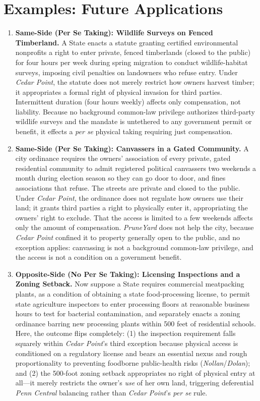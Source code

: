\documentclass[12pt]{article}
\begin{document}
\section{Examples: Future Applications}
\begin{enumerate}

\item \textbf{Same-Side (Per Se Taking): Wildlife Surveys on Fenced Timberland.} A State enacts a statute granting certified environmental nonprofits a right to enter private, fenced timberlands (closed to the public) for four hours per week during spring migration to conduct wildlife-habitat surveys, imposing civil penalties on landowners who refuse entry. Under \textit{Cedar Point}, the statute does not merely restrict how owners harvest timber; it appropriates a formal right of physical invasion for third parties. Intermittent duration (four hours weekly) affects only compensation, not liability. Because no background common-law privilege authorizes third-party wildlife surveys and the mandate is untethered to any government permit or benefit, it effects a \emph{per se} physical taking requiring just compensation.

\item \textbf{Same-Side (Per Se Taking): Canvassers in a Gated Community.} A city ordinance requires the owners' association of every private, gated residential community to admit registered political canvassers two weekends a month during election season so they can go door to door, and fines associations that refuse. The streets are private and closed to the public. Under \textit{Cedar Point}, the ordinance does not regulate how owners use their land; it grants third parties a right to physically enter it, appropriating the owners' right to exclude. That the access is limited to a few weekends affects only the amount of compensation. \textit{PruneYard} does not help the city, because \textit{Cedar Point} confined it to property generally open to the public, and no exception applies: canvassing is not a background common-law privilege, and the access is not a condition on a government benefit.

\item \textbf{Opposite-Side (No Per Se Taking): Licensing Inspections and a Zoning Setback.} Now suppose a State requires commercial meatpacking plants, as a condition of obtaining a state food-processing license, to permit state agriculture inspectors to enter processing floors at reasonable business hours to test for bacterial contamination, and separately enacts a zoning ordinance barring new processing plants within 500 feet of residential schools. Here, the outcome flips completely: (1) the inspection requirement falls squarely within \textit{Cedar Point}'s third exception because physical access is conditioned on a regulatory license and bears an essential nexus and rough proportionality to preventing foodborne public-health risks (\textit{Nollan}/\textit{Dolan}); and (2) the 500-foot zoning setback appropriates no right of physical entry at all---it merely restricts the owner's \emph{use} of her own land, triggering deferential \textit{Penn Central} balancing rather than \textit{Cedar Point}'s \emph{per se} rule.


\end{enumerate}
\end{document}
